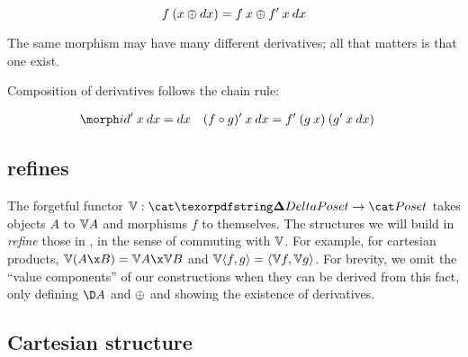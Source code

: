\documentclass{rntz}\usepackage{fantasy}%
\begin{document}
\nopagebreak[2]
\[ f\<(x \upd \dx) = f\<x \upd \deriv f\<x\<\dx \]


\noindent
The same morphism may have many different derivatives; all that matters is that
one exist.

Composition of derivatives follows the chain rule:

\nopagebreak[2]
\begin{align*}
  \deriv\id \<x\<\dx &= \dx
  & \deriv{(f \circ g)} \<x\<\dx &= \deriv f \<(g\<x) \<(\deriv g\<x\<\dx)
\end{align*}





\subsection{\CP{} refines \Poset{}}
\label{sec:refines}

The forgetful functor $\valfn : \CP \to \Poset$ takes objects $A$ to $\mathbb{V}{A}$
and morphisms $f$ to themselves. The structures we will build in \CP{}
\emph{refine} those in \Poset{}, in the sense of commuting with $\mathbb{V}$. For
example, for cartesian products, $\vals{(A \x B)} = \vals{A} \x \vals{B}$ and
$\mathbb{V}{\langle{f,g}\rangle} = \langle{\ensuremath{\mathbb{V}}f, \ensuremath{\mathbb{V}}g}\rangle$.
%
For brevity, we omit the ``value components'' of our constructions when they can
be derived from this fact, only defining $\chgs{A}$ and $\mathbin{\oplus}$ and showing the
existence of derivatives.


\subsection{Cartesian structure}
\label{sec:CP-cartesian}
\end{document}
